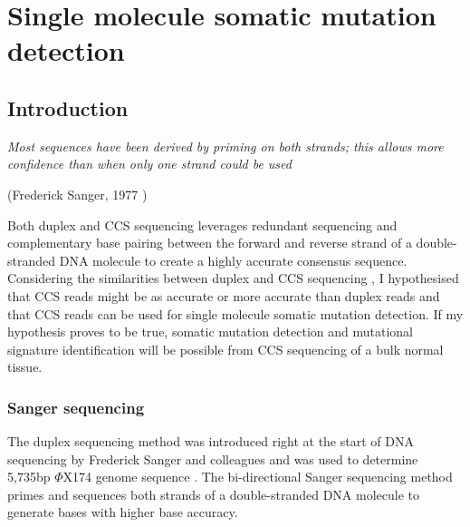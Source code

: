 
\chapter{Single molecule somatic mutation detection}
\label{chapter:chapter2}

\ifpdf
    \graphicspath{{Chapter2/Figs/Raster/}{Chapter2/Figs/PDF/}{Chapter2/Figs/}}
\else
    \graphicspath{{Chapter2/Figs/Vector/}{Chapter2/Figs/}}
\fi

\section{Introduction}

\textit{Most sequences have been derived by priming on both strands; this allows more confidence than when only one strand could be used} 
\begin{flushright} (Frederick Sanger, 1977 \cite{Sanger1977-os}) \end{flushright}


Both duplex and CCS sequencing leverages redundant sequencing and complementary base pairing between the forward and reverse strand of a double-stranded DNA molecule to create a highly accurate consensus sequence. Considering the similarities between duplex and CCS sequencing \cite{Schmitt2012-yr, Hoang2016-jx, Abascal2021-pk}, I hypothesised that CCS reads might be as accurate or more accurate than duplex reads and that CCS reads can be used for single molecule somatic mutation detection. If my hypothesis proves to be true, somatic mutation detection and mutational signature identification will be possible from CCS sequencing of a bulk normal tissue. 

\subsection{Sanger sequencing}

The duplex sequencing method was introduced right at the start of DNA sequencing by Frederick Sanger and colleagues and was used to determine 5,735bp $\Phi$X174 genome sequence \cite{Sanger1977-os}. The bi-directional Sanger sequencing method primes and sequences both strands of a double-stranded DNA molecule to generate bases with higher base accuracy. 

